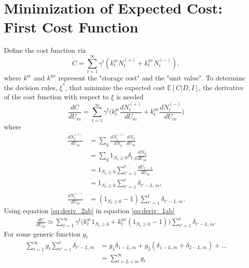 \section{Minimization of Expected Cost: First Cost Function}
\label{app:deriva}
Define the cost function viz
\begin{equation}
	C = \sum_{t=1}^{\infty}\gamma^{t}(k^\text{sc}_{t}N_{t}^{(+)}+k_{t}^\text{uv}N_{t}^{(-)}),
\end{equation}
where $k^\text{sc}$ and $k^\text{uv}$ represent the "storage cost" and the "unit value". To determine the decision rules, $\xi^*$, that minimize the expected cost $\mathbb{E}[C|D,I]$, the derivative of the cost function with respect to $\xi$ is needed
\begin{equation}
		\frac{dC}{dU_m} = \sum_{t=1}^{\infty}\gamma^{t}\bigg(k^\text{sc}_{t}\frac{dN_{t}^{(+)}}{dU_m}+k_{t}^\text{uv}\frac{dN_{t}^{(-)}}{dU_m}\bigg)
	\label{eq:deriv_1ab}
\end{equation}
where
\begin{equation}
	\begin{split}
		\frac{dN_{t}^{(+)}}{dU_m}& =\sum_q 	\frac{dN_{t}^{(+)}}{dN_q}\frac{dN_q}{dU_m}\\
		& =\sum_q 	1_{N_{t}\geq 0}\delta_{t,q}\frac{dN_q}{dU_m}\\
		& = 1_{N_{t}\geq 0}\sum_{t'=1}^t\frac{dU_{t'-L}}{dU_m}\\
		& = 1_{N_{t}\geq 0}\sum_{t'=1}^t\delta_{t'-L,m},\\
		\frac{dN_{t}^{(-)}}{dU_m} &= (1_{N_t\geq 0}-1)\sum_{t'=1}^t\delta_{t'-L,m}.
		\label{eq:deriv_2ab}
	\end{split}
\end{equation}
Using equation \eqref{eq:deriv_2ab} in equation \eqref{eq:deriv_1ab} 
\begin{equation}
	\begin{split}
		\frac{dC}{dU_m} \simeq \sum_{t=1}^{\infty}\gamma^{t}\bigg(k^\text{sc}_{t}1_{N_{t}\geq 0}+k_{t}^\text{uv}(1_{N_{t}\geq 0}-1)\bigg)\sum_{t'=1}^t\delta_{t'-L,m}.
	\end{split}
\end{equation}
For some generic function $g_t$
\begin{equation}
	\begin{split}
		\sum_{t=1}^{\infty}g_t\sum_{t'=1}^t\delta_{t'-L,m} & = g_1\delta_{1-L,m}+g_2(\delta_{1-L,m}+\delta_{2-L,m})+\dots\\
		&=\sum_{t=L+m}^\infty g_t
	\end{split}
\end{equation}
